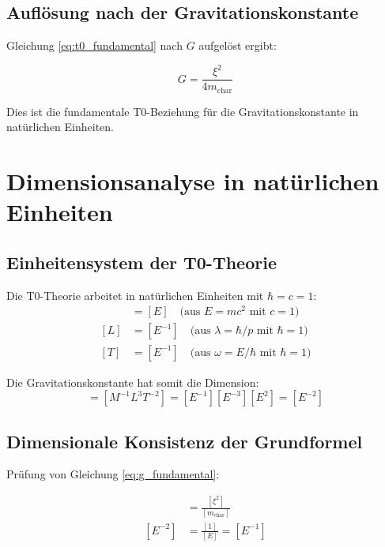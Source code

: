 \documentclass[12pt,a4paper]{article}
\begin{document}
	\subsection{Auflösung nach der Gravitationskonstante}
	
	Gleichung \eqref{eq:t0_fundamental} nach $G$ aufgelöst ergibt:
	
	\begin{equation}
		G = \frac{\xi^2}{4 m_{\text{char}}}
		\label{eq:g_fundamental}
	\end{equation}
	
	Dies ist die fundamentale T0-Beziehung für die Gravitationskonstante in natürlichen Einheiten.
	
	\section{Dimensionsanalyse in natürlichen Einheiten}
	
	\subsection{Einheitensystem der T0-Theorie}
	
	\begin{analysis}
		Die T0-Theorie arbeitet in natürlichen Einheiten mit $\hbar = c = 1$:
		\begin{align}
			[M] &= [E] \quad \text{(aus } E = mc^2 \text{ mit } c = 1\text{)} \\
			[L] &= [E^{-1}] \quad \text{(aus } \lambda = \hbar/p \text{ mit } \hbar = 1\text{)} \\
			[T] &= [E^{-1}] \quad \text{(aus } \omega = E/\hbar \text{ mit } \hbar = 1\text{)}
		\end{align}
		
		Die Gravitationskonstante hat somit die Dimension:
		\begin{equation}
			[G] = [M^{-1}L^3T^{-2}] = [E^{-1}][E^{-3}][E^2] = [E^{-2}]
		\end{equation}
	\end{analysis}
	
	\subsection{Dimensionale Konsistenz der Grundformel}
	
	Prüfung von Gleichung \eqref{eq:g_fundamental}:
	
	\begin{align}
		[G] &= \frac{[\xi^2]}{[m_{\text{char}}]} \\
		[E^{-2}] &= \frac{[1]}{[E]} = [E^{-1}]
	\end{align}
	
\end{document}
